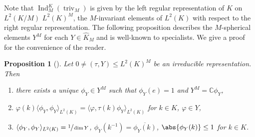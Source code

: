 \documentclass[JEP,XML,SOM,NoFloatCountersInSection,Unicode,published]{cedram}
\newtheorem{proposition}[theorem]{Proposition}
\theoremstyle{definition}
\DeclarePairedDelimiter{\abs}\lvert\rvert
\newcommand{\on}[1]{\ensuremath{\operatorname{#1}}}
\newcommand{\C}{\ensuremath{\mathbb{C}}}
\begin{document}
Note that $\on{Ind}_M^K(\on{triv}_M)$ is given by the left regular representation of $K$ on $L^2(K/M)$ \resp $L^2(K)^M$, the $M$-invariant elements of $L^2(K)$ with respect to the right regular representation. The following proposition describes the $M$-spherical elements $Y^M$ for each $Y\in\hat K_M$ and is well-known to specialists. We give a proof for the convenience of the reader.
\begin{proposition}[]\label{prop:helg_general}
Let $0\neq(\tau,Y)\leq L^2(K)^M$ be an irreducible representation. Then
\begin{enumerate}
\item there exists a unique $\phi_Y\in Y^M$ such that $\phi_Y(e)=1$ and $Y^M=\C\phi_Y$,\label{prop:helg_general_i}
\item $\varphi(k)\langle\phi_Y,\phi_Y\rangle_{L^2(K)}=\langle\varphi,\tau(k)\phi_Y\rangle_{L^2(K)}$ for $k\in K$, $\varphi\in Y$\label{prop:helg_general_ii},
\item $\langle\phi_Y,\phi_Y\rangle_{L^2(K)}=\sfrac{1}{\on{dim}Y}$, $\phi_Y(k^{-1})=\overline{\phi_Y(k)}$, $\abs{\phi_Y(k)}\leq1$ for $k\in K$\label{prop:helg_general_iii}.
\end{enumerate}
\end{proposition}
\end{document}
